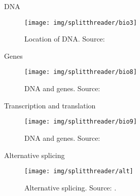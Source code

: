 \documentclass[10pt]{beamer}
\newcommand{\1}{
	\setbeamertemplate{background}{
		\texttt{[image: img/1]}
		\tikz[overlay] \fill[fill opacity=0.75,fill=white] (0,0) rectangle (-\paperwidth,\paperheight);
	}
}
\begin{document}
\begin{frame}{DNA}{}	
	\begin{figure}
		\centering
		\texttt{[image: img/splitthreader/bio3]}
		\caption{Location of DNA. Source: \cite{archibald2018genomics}}
	\end{figure}		
\end{frame}

\begin{frame}{Genes}{}	
	\begin{figure}
		\centering
		\texttt{[image: img/splitthreader/bio8]}
		\caption{DNA and genes. Source: \cite{archibald2018genomics}}
	\end{figure}		
\end{frame}

\begin{frame}{Transcription and translation}{}	
	\begin{figure}
		\centering
		\texttt{[image: img/splitthreader/bio9]}
		\caption{DNA and genes. Source: \cite{xiong2006essential}}
	\end{figure}		
\end{frame}

\begin{frame}{Alternative splicing}{}
	\begin{figure}[]
		\centering
		\texttt{[image: img/splitthreader/alt]}
		\label{img:mot2}
		\caption{Alternative splicing. Source: \cite{genbio2020}.}
	\end{figure}
\end{frame}
\end{document}
